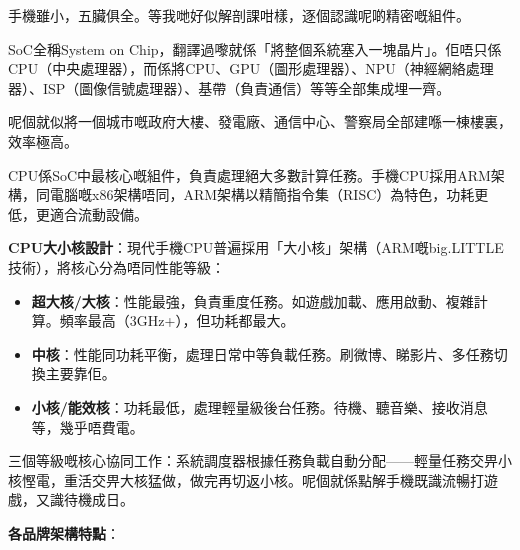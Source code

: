 


手機雖小，五臟俱全。等我哋好似解剖課咁樣，逐個認識呢啲精密嘅組件。


SoC全稱System on Chip，翻譯過嚟就係「將整個系統塞入一塊晶片」。佢唔只係CPU（中央處理器），而係將CPU、GPU（圖形處理器）、NPU（神經網絡處理器）、ISP（圖像信號處理器）、基帶（負責通信）等等全部集成埋一齊。

呢個就似將一個城市嘅政府大樓、發電廠、通信中心、警察局全部建喺一棟樓裏，效率極高。


CPU係SoC中最核心嘅組件，負責處理絕大多數計算任務。手機CPU採用ARM架構，同電腦嘅x86架構唔同，ARM架構以精簡指令集（RISC）為特色，功耗更低，更適合流動設備。

\textbf{CPU大小核設計}：現代手機CPU普遍採用「大小核」架構（ARM嘅big.LITTLE技術），將核心分為唔同性能等級：

\begin{itemize}
  \item \textbf{超大核/大核}：性能最強，負責重度任務。如遊戲加載、應用啟動、複雜計算。頻率最高（3GHz+），但功耗都最大。
  \item \textbf{中核}：性能同功耗平衡，處理日常中等負載任務。刷微博、睇影片、多任務切換主要靠佢。
  \item \textbf{小核/能效核}：功耗最低，處理輕量級後台任務。待機、聽音樂、接收消息等，幾乎唔費電。
\end{itemize}

三個等級嘅核心協同工作：系統調度器根據任務負載自動分配——輕量任務交畀小核慳電，重活交畀大核猛做，做完再切返小核。呢個就係點解手機既識流暢打遊戲，又識待機成日。

\textbf{各品牌架構特點}：

